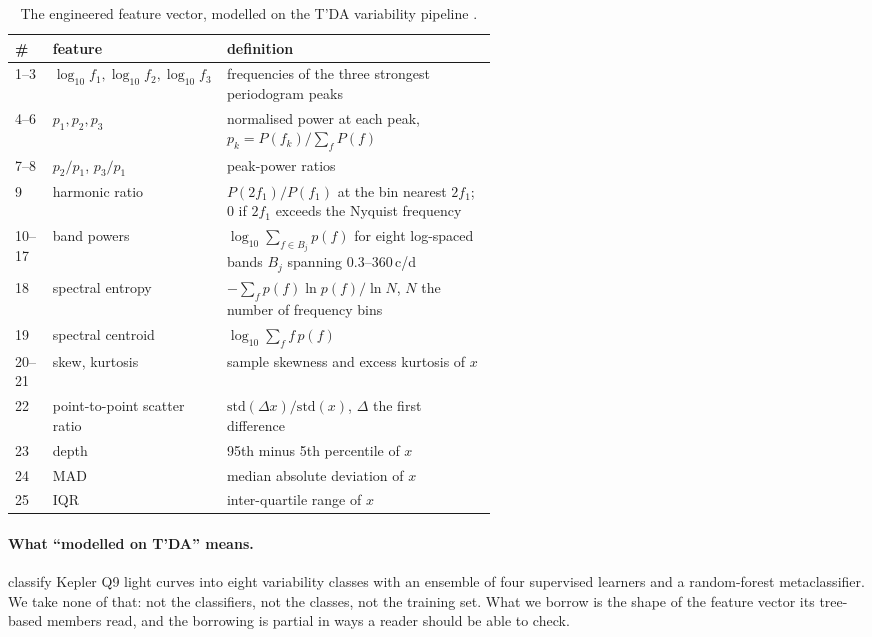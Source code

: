 \documentclass{article}
\begin{document}
\begin{table}[H]
\caption{The engineered feature vector, modelled on the T'DA variability pipeline \citep{audenaert2021}.}
\label{tab:features}
\centering
\small
\begin{tabular}{llp{0.56\linewidth}}
\toprule
\# & feature & definition \\
\midrule
1--3 & $\log_{10} f_{1}, \log_{10} f_{2}, \log_{10} f_{3}$ & frequencies of the three strongest periodogram peaks \\
4--6 & $p_{1}, p_{2}, p_{3}$ & normalised power at each peak, $p_{k} = P(f_{k})/\sum_f P(f)$ \\
7--8 & $p_{2}/p_{1}$, $p_{3}/p_{1}$ & peak-power ratios \\
9 & harmonic ratio & $P(2f_{1})/P(f_{1})$ at the bin nearest $2f_{1}$; $0$ if $2f_{1}$ exceeds the Nyquist frequency \\
10--17 & band powers & $\log_{10} \sum_{f \in B_{j}} p(f)$ for eight log-spaced bands $B_{j}$ spanning 0.3--360\,c/d \\
18 & spectral entropy & $-\sum_f p(f)\ln p(f) / \ln N$, $N$ the number of frequency bins \\
19 & spectral centroid & $\log_{10} \sum_f f\,p(f)$ \\
20--21 & skew, kurtosis & sample skewness and excess kurtosis of $x$ \\
22 & point-to-point scatter ratio & $\mathrm{std}(\Delta x)/\mathrm{std}(x)$, $\Delta$ the first difference \\
23 & depth & 95th minus 5th percentile of $x$ \\
24 & MAD & median absolute deviation of $x$ \\
25 & IQR & inter-quartile range of $x$ \\
\bottomrule
\end{tabular}
\end{table}

\paragraph{What ``modelled on T'DA'' means.} \citet{audenaert2021} classify Kepler Q9 light curves
into eight variability classes with an ensemble of four supervised learners and a random-forest
metaclassifier. We take none of that: not the classifiers, not the classes, not the training set.
What we borrow is the shape of the feature vector its tree-based members read, and the borrowing is
partial in ways a reader should be able to check.
\end{document}
